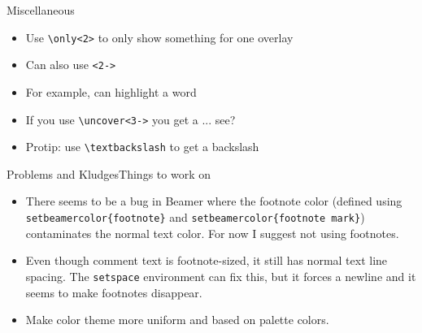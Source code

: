 % 	
% 	



\begin{frame}[c]{Miscellaneous}
	\begin{itemize}
		\item Use \texttt{\textbackslash only<2>} to only show something for one overlay
		\item Can also use \texttt{<2->}
		\item For example, can  highlight a word
		\item If you use \texttt{\textbackslash uncover<3->} you get a  ... see?
		\item Protip: use \texttt{\textbackslash textbackslash} to get a backslash
	\end{itemize}
\end{frame}



\begin{frame}[c]{Problems and Kludges}{Things to work on}
	\begin{itemize}
		\item There seems to be a bug in Beamer where the footnote color (defined using \texttt{setbeamercolor\{footnote\}} and \texttt{setbeamercolor\{footnote mark\}}) contaminates the normal text color. For now I suggest not using footnotes. 
		\item Even though comment text is footnote-sized, it still has normal text line spacing. The \texttt{setspace} environment can fix this, but it forces a newline and it seems to make footnotes disappear. 
		\item Make color theme more uniform and based on palette colors.
	\end{itemize}
\end{frame}


